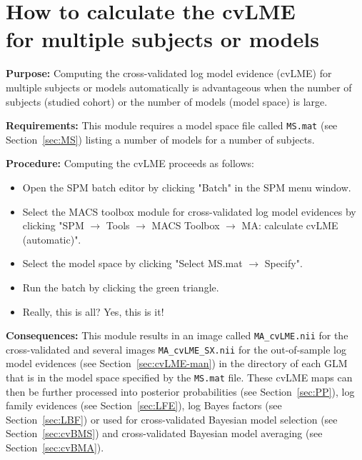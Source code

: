 \documentclass[a4paper,12pt]{article}
\newcommand{\ra}{$\rightarrow$ }
\begin{document}
\pagebreak
\section[How to calculate the cvLME for multiple subjects or models]{How to calculate the cvLME \\ for multiple subjects or models} \label{sec:cvLME-auto}

\textbf{Purpose:} Computing the cross-validated log model evidence (cvLME) for multiple subjects or models automatically is advantageous when the number of subjects (studied cohort) or the number of models (model space) is large.

\textbf{Requirements:} This module requires a model space file called \texttt{MS.mat} (see Section~\ref{sec:MS}) listing a number of models for a number of subjects.

\textbf{Procedure:} Computing the cvLME proceeds as follows:
\begin{itemize}

\item
Open the SPM batch editor by clicking "Batch" in the SPM menu window.

\item
Select the MACS toolbox module for cross-validated log model evidences by clicking "SPM \ra Tools \ra MACS Toolbox \ra MA: calculate cvLME (automatic)".

\item
Select the model space by clicking "Select MS.mat \ra Specify".

\item
Run the batch by clicking the green triangle.

\item
Really, this is all? Yes, this is it!

\end{itemize}

\textbf{Consequences:} This module results in an image called \texttt{MA\_cvLME.nii} for the cross-validated and several images \texttt{MA\_cvLME\_SX.nii} for the out-of-sample log model evidences (see Section~\ref{sec:cvLME-man}) in the directory of each GLM that is in the model space specified by the \texttt{MS.mat} file. These cvLME maps can then be further processed into posterior probabilities (see Section~\ref{sec:PP}), log family evidences (see Section~\ref{sec:LFE}), log Bayes factors (see Section~\ref{sec:LBF}) or used for cross-validated Bayesian model selection (see Section~\ref{sec:cvBMS}) and cross-validated Bayesian model averaging (see Section~\ref{sec:cvBMA}).
\end{document}
